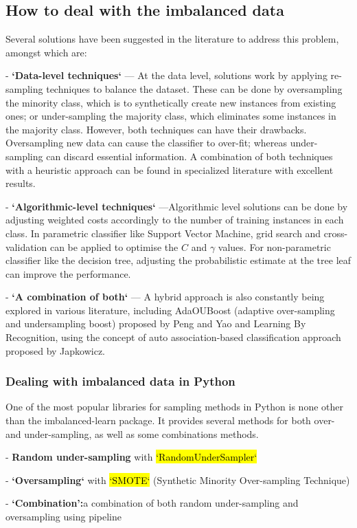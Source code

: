 \subsection{How to deal with the imbalanced data}
Several solutions have been suggested in the literature to address this problem, amongst which are:

- \textbf{`Data-level techniques`} — At the data level, solutions work by applying re-sampling techniques to balance the dataset. These can be done by oversampling the minority class, which is to synthetically create new instances from existing ones; or under-sampling the majority class, which eliminates some instances in the majority class. However, both techniques can have their drawbacks. Oversampling new data can cause the classifier to over-fit; whereas under-sampling can discard essential information. A combination of both techniques with a heuristic approach can be found in specialized literature with excellent results.

- \textbf{`Algorithmic-level techniques`} —Algorithmic level solutions can be done by adjusting weighted costs accordingly to the number of training instances in each class. In parametric classifier like Support Vector Machine, grid search and cross-validation can be applied to optimise the $C$ and $\gamma$ values. For non-parametric classifier like the decision tree, adjusting the probabilistic estimate at the tree leaf can improve the performance.

- \textbf{`A combination of both`} — A hybrid approach is also constantly being explored in various literature, including AdaOUBoost (adaptive over-sampling and undersampling boost) proposed by Peng and Yao and Learning By Recognition, using the concept of auto association-based classification approach proposed by Japkowicz.

\subsubsection{Dealing with imbalanced data in Python}
One of the most popular libraries for sampling methods in Python is none other than the imbalanced-learn package. It provides several methods for both over- and under-sampling, as well as some combinations methods. 

- \textbf{Random under-sampling} with \hl{`RandomUnderSampler`}

- \textbf{`Oversampling`} with \hl{`SMOTE`} (Synthetic Minority Over-sampling Technique)

- \textbf{`Combination':}a combination of both random under-sampling and oversampling using pipeline

